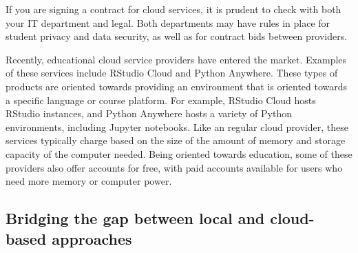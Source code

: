 {\begin{framed}
If you are signing a contract for cloud services, it is prudent to check with both your IT department and legal. 
Both departments may have rules in place for student privacy and data security, as well as for contract bids between providers.
\end{framed}}

Recently, educational cloud service providers have entered the market.
Examples of these services include RStudio Cloud and Python Anywhere. 
These types of products are oriented towards providing an environment that is oriented towards a specific language or course platform. 
For example, RStudio Cloud hosts RStudio instances, and Python Anywhere hosts a variety of Python environments, including Jupyter notebooks. 
Like an regular cloud provider, these services typically charge based on the size of the amount of memory and storage capacity of the computer needed.
Being oriented towards education, some of these providers also offer accounts for free, with paid accounts available for users who need more memory or computer power.






{}

\subsection{Bridging the gap between local and cloud-based approaches}

